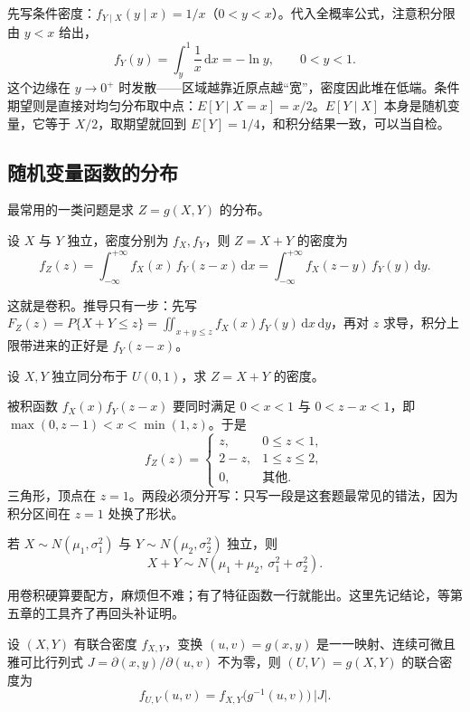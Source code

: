 先写条件密度：$f_{Y\mid X}(y\mid x)=1/x$（$0<y<x$）。代入全概率公式，注意积分限由 $y<x$ 给出，
\[
f_Y(y)=\int_{y}^{1}\frac{1}{x}\,\mathrm{d}x=-\ln y,\qquad 0<y<1 .
\]
这个边缘在 $y\to 0^{+}$ 时发散——区域越靠近原点越“宽”，密度因此堆在低端。条件期望则是直接对均匀分布取中点：$E[Y\mid X=x]=x/2$。$E[Y\mid X]$ 本身是随机变量，它等于 $X/2$，取期望就回到 $E[Y]=1/4$，和积分结果一致，可以当自检。

\subsection{随机变量函数的分布}

最常用的一类问题是求 $Z=g(X,Y)$ 的分布。

\begin{proposition}[和的分布]
设 $X$ 与 $Y$ 独立，密度分别为 $f_X,f_Y$，则 $Z=X+Y$ 的密度为
\[
f_Z(z)=\int_{-\infty}^{+\infty} f_X(x)\,f_Y(z-x)\,\mathrm{d}x
=\int_{-\infty}^{+\infty} f_X(z-y)\,f_Y(y)\,\mathrm{d}y .
\]
\end{proposition}

这就是卷积。推导只有一步：先写 $F_Z(z)=P\{X+Y\le z\}=\iint_{x+y\le z} f_X(x)f_Y(y)\,\mathrm{d}x\,\mathrm{d}y$，再对 $z$ 求导，积分上限带进来的正好是 $f_Y(z-x)$。

\begin{example}[两个均匀分布相加]
设 $X,Y$ 独立同分布于 $U(0,1)$，求 $Z=X+Y$ 的密度。
\end{example}

被积函数 $f_X(x)f_Y(z-x)$ 要同时满足 $0<x<1$ 与 $0<z-x<1$，即 $\max(0,z-1)<x<\min(1,z)$。于是
\[
f_Z(z)=
\begin{cases}
z, & 0\le z<1,\\
2-z, & 1\le z\le 2,\\
0, & \text{其他}.
\end{cases}
\]
三角形，顶点在 $z=1$。两段必须分开写：只写一段是这套题最常见的错法，因为积分区间在 $z=1$ 处换了形状。

\begin{proposition}[正态分布的可加性]
若 $X\sim N(\mu_1,\sigma_1^2)$ 与 $Y\sim N(\mu_2,\sigma_2^2)$ 独立，则
\[
X+Y\sim N(\mu_1+\mu_2,\ \sigma_1^2+\sigma_2^2).
\]
\end{proposition}

用卷积硬算要配方，麻烦但不难；有了特征函数一行就能出。这里先记结论，等第五章的工具齐了再回头补证明。

\begin{proposition}[二维随机变量函数的分布]
设 $(X,Y)$ 有联合密度 $f_{X,Y}$，变换 $(u,v)=g(x,y)$ 是一一映射、连续可微且雅可比行列式 $J=\partial(x,y)/\partial(u,v)$ 不为零，则 $(U,V)=g(X,Y)$ 的联合密度为
\[
f_{U,V}(u,v)=f_{X,Y}\big(g^{-1}(u,v)\big)\,|J| .
\]
\end{proposition}

